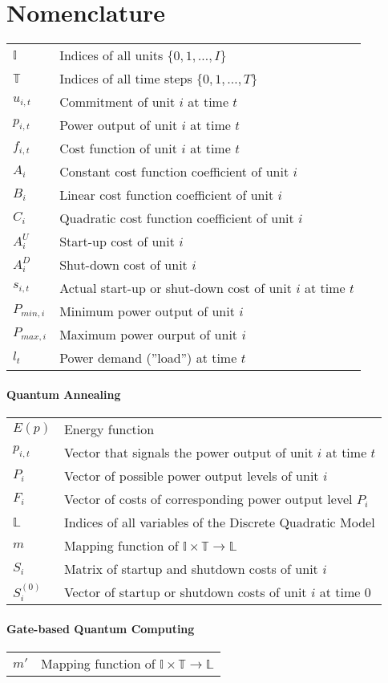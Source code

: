 \chapter*{Nomenclature}

\begin{tabular}{ll}
  $\mathbb{I}$ & Indices of all units $\{0, 1, \ldots, I\}$\\
  $\mathbb{T}$ & Indices of all time steps $\{0, 1, \ldots, T\}$ \\
  $u_{i, t}$ & Commitment of unit $i$ at time $t$ \\
  $p_{i, t}$ & Power output of unit $i$ at time $t$ \\
  $f_{i, t}$ & Cost function of unit $i$ at time $t$ \\
  $A_i$ & Constant cost function coefficient of unit $i$ \\
  $B_i$ & Linear cost function coefficient of unit $i$ \\
  $C_i$ & Quadratic cost function coefficient of unit $i$ \\
  $A^U_i$ & Start-up cost of unit $i$ \\
  $A^D_i$ & Shut-down cost of unit $i$ \\
  $s_{i, t}$ & Actual start-up or shut-down cost of unit $i$ at time $t$ \\
  $P_{min, i}$ & Minimum power output of unit $i$ \\
  $P_{max, i}$ & Maximum power ourput of unit $i$ \\
  $l_t$ & Power demand (''load'') at time $t$
\end{tabular}

\subsubsection{Quantum Annealing}

\begin{tabular}{ll}
  $E(p)$ & Energy function \\
  $p_{i, t}$ & Vector that signals the power output of unit $i$ at time $t$ \\
  $P_{i}$ & Vector of possible power output levels of unit $i$ \\
  $F_{i}$ & Vector of costs of corresponding power output level $P_{i}$ \\
  $\mathbb{L}$ & Indices of all variables of the Discrete Quadratic Model \\
  $m$ & Mapping function of $\mathbb{I} \times \mathbb{T} \to \mathbb{L}$ \\
  $S_{i}$ & Matrix of startup and shutdown costs of unit $i$ \\
  $S_i^{(0)}$ & Vector of startup or shutdown costs of unit $i$ at time $0$
\end{tabular}

\subsubsection{Gate-based Quantum Computing}

\begin{tabular}{ll}
  $m'$ & Mapping function of $\mathbb{I} \times \mathbb{T} \to \mathbb{L}$
\end{tabular}

